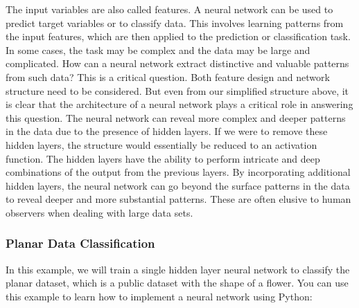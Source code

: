 \documentclass{article}
\begin{document}
The input variables are also called features. A neural network can be used to predict target variables or to classify data. This involves learning patterns from the input features, which are then applied to the prediction or classification task. In some cases, the task may be complex and the data may be large and complicated. How can a neural network extract distinctive and valuable patterns from such data? This is a critical question. Both feature design and network structure need to be considered. But even from our simplified structure above, it is clear that the architecture of a neural network plays a critical role in answering this question. The neural network can reveal more complex and deeper patterns in the data due to the presence of hidden layers. If we were to remove these hidden layers, the structure would essentially be reduced to an activation function. The hidden layers have the ability to perform intricate and deep combinations of the output from the previous layers. By incorporating additional hidden layers, the neural network can go beyond the surface patterns in the data to reveal deeper and more substantial patterns. These are often elusive to human observers when dealing with large data sets.


\newpage
	\subsubsection{Planar Data Classification}


In this example, we will train a single hidden layer neural network to classify the planar dataset, which is a public dataset with the shape of a flower. You can use this example to learn how to implement a neural network using Python:


\end{document}
